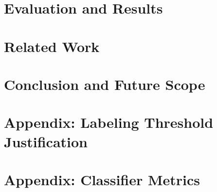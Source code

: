 \cleardoublepage
\ifodd\value{page}\null\thispagestyle{empty}\newpage\fi
\chapter{Evaluation and Results} \label{Evaluation and Results}


\cleardoublepage
\ifodd\value{page}\null\thispagestyle{empty}\newpage\fi
\chapter{Related Work} \label{Related work}


\cleardoublepage
\ifodd\value{page}\null\thispagestyle{empty}\newpage\fi
\chapter{Conclusion and Future Scope} \label{Conclusion and Future Scope}


\cleardoublepage
\printbibliography[heading=bibintoc]
\markboth{}{} %

\cleardoublepage
\appendix

\renewcommand{\thefigure}{\Alph{chapter}.\arabic{figure}}
\renewcommand{\thetable}{\Alph{chapter}.\arabic{table}}

\renewcommand{\thechapter}{A}
\chapter*{Appendix: Labeling Threshold Justification}
\label{appendix:labeling}


\renewcommand{\thechapter}{B}
\chapter*{Appendix: Classifier Metrics}
\label{appendix:classifier}


